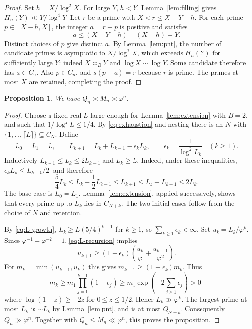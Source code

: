 \documentclass[11pt,letterpaper]{article}
\numberwithin{equation}{section}
\newtheorem{proposition}[theorem]{Proposition}
\theoremstyle{remark}
\newcommand{\ph}{\varphi}
\newcommand{\ceil}[1]{\lceil #1\rceil}
\begin{document}
\begin{proof}
Set $h=X/\log^2X$. For large $Y$, $h<Y$. Lemma~\ref{lem:filling}
gives $H_n(Y)\ll Y/\log^4Y$. Let $r$ be a prime with
$X<r\le X+Y-h$. For each prime $p\in[X-h,X]$, the integer
$a=r-p$ is positive and satisfies
\[
 a\le(X+Y-h)-(X-h)=Y.
\]
Distinct choices of $p$ give distinct $a$. By Lemma~\ref{lem:pnt},
the number of candidate primes is asymptotic to $X/\log^3X$, which
exceeds $H_n(Y)$ for sufficiently large $Y$: indeed $X\asymp_B Y$
and $\log X\sim\log Y$. Some candidate therefore has $a\in C_n$.
Also $p\in C_n$, and $s(p+a)=r$ because $r$ is prime. The primes
at most $X$ are retained, completing the proof.
\end{proof}

\begin{proposition}\label{prop:rough-scales}
We have $Q_n\asymp M_n\asymp\ph^n$.
\end{proposition}

\begin{proof}
Choose a fixed real $L$ large enough for Lemma~\ref{lem:extension}
with $B=2$, and such that $1/\log^2L\le1/4$.
By \eqref{eq:exhaustion} and nesting there is an $N$ with
$\{1,\ldots,\ceil L\}\subseteq C_N$. Define
\begin{equation}\label{eq:L-recursion}
 L_0=L_1=L,\qquad
 L_{k+1}=L_k+L_{k-1}-\epsilon_kL_k,\qquad
 \epsilon_k=\frac1{\log^2L_k}\quad(k\ge1).
\end{equation}
Inductively $L_{k-1}\le L_k\le2L_{k-1}$ and $L_k\ge L$.
Indeed, under these inequalities, $\epsilon_kL_k\le L_{k-1}/2$,
and therefore
\begin{equation}\label{eq:L-growth}
 \frac54L_k\le L_k+\frac12L_{k-1}
 \le L_{k+1}\le L_k+L_{k-1}\le2L_k.
\end{equation}
The base case is $L_0=L_1$. Lemma~\ref{lem:extension}, applied
successively, shows that every prime up to $L_k$ lies in $C_{N+k}$.
The two initial cases follow from the choice of $N$ and retention.

By \eqref{eq:L-growth}, $L_k\ge L(5/4)^{k-1}$ for $k\ge1$,
so $\sum_{k\ge1}\epsilon_k<\infty$. Set $u_k=L_k/\ph^k$.
Since $\ph^{-1}+\ph^{-2}=1$, \eqref{eq:L-recursion} implies
\[
 u_{k+1}\ge(1-\epsilon_k)
 \left(\frac{u_k}{\ph}+\frac{u_{k-1}}{\ph^2}\right).
\]
For $m_k=\min(u_{k-1},u_k)$ this gives
$m_{k+1}\ge(1-\epsilon_k)m_k$. Thus
\[
 m_k\ge m_1\prod_{j=1}^{k-1}(1-\epsilon_j)
 \ge m_1\exp\left(-2\sum_{j\ge1}\epsilon_j\right)>0,
\]
where $\log(1-z)\ge-2z$ for $0\le z\le1/2$.
Hence $L_k\gg\ph^k$. The largest prime at most $L_k$ is
$\sim L_k$ by Lemma~\ref{lem:pnt}, and is at most $Q_{N+k}$.
Consequently $Q_n\gg\ph^n$. Together with $Q_n\le M_n\ll\ph^n$,
this proves the proposition.
\end{proof}
\end{document}
